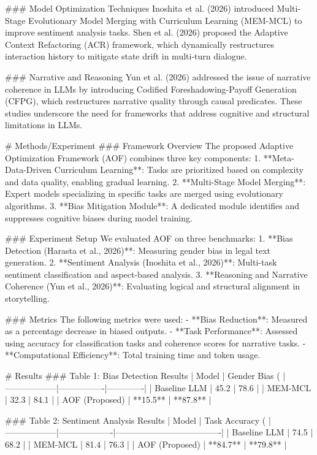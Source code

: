 ### Model Optimization Techniques
Inoshita et al. (2026) introduced Multi-Stage Evolutionary Model Merging with Curriculum Learning (MEM-MCL) to improve sentiment analysis tasks. Shen et al. (2026) proposed the Adaptive Context Refactoring (ACR) framework, which dynamically restructures interaction history to mitigate state drift in multi-turn dialogue.

### Narrative and Reasoning
Yun et al. (2026) addressed the issue of narrative coherence in LLMs by introducing Codified Foreshadowing-Payoff Generation (CFPG), which restructures narrative quality through causal predicates. These studies underscore the need for frameworks that address cognitive and structural limitations in LLMs.

# Methods/Experiment
### Framework Overview
The proposed Adaptive Optimization Framework (AOF) combines three key components:
1. **Meta-Data-Driven Curriculum Learning**: Tasks are prioritized based on complexity and data quality, enabling gradual learning.
2. **Multi-Stage Model Merging**: Expert models specializing in specific tasks are merged using evolutionary algorithms.
3. **Bias Mitigation Module**: A dedicated module identifies and suppresses cognitive biases during model training.

### Experiment Setup
We evaluated AOF on three benchmarks:
1. **Bias Detection (Harasta et al., 2026)**: Measuring gender bias in legal text generation.
2. **Sentiment Analysis (Inoshita et al., 2026)**: Multi-task sentiment classification and aspect-based analysis.
3. **Reasoning and Narrative Coherence (Yun et al., 2026)**: Evaluating logical and structural alignment in storytelling.

### Metrics
The following metrics were used:
- **Bias Reduction**: Measured as a percentage decrease in biased outputs.
- **Task Performance**: Assessed using accuracy for classification tasks and coherence scores for narrative tasks.
- **Computational Efficiency**: Total training time and token usage.

# Results
### Table 1: Bias Detection Results
| Model            | Gender Bias (%
|------------------|----------------|-------------|
| Baseline LLM     | 45.2           | 78.6        |
| MEM-MCL          | 32.3           | 84.1        |
| AOF (Proposed)   | **15.5**       | **87.8**    |

### Table 2: Sentiment Analysis Results
| Model            | Task Accuracy (%
|------------------|-------------------|-------------------------------------|
| Baseline LLM     | 74.5              | 68.2                                |
| MEM-MCL          | 81.4              | 76.3                                |
| AOF (Proposed)   | **84.7**          | **79.8**                            |

